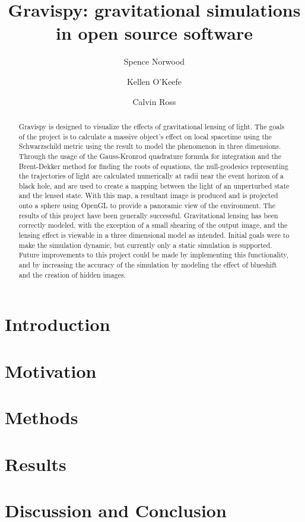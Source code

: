 \documentclass[
aps,prd,
preprint,
onecolumn,
12pt,
amsmath, amssymb,
secnumarabic,
]{revtex4-1}
\begin{document}
\title{Gravispy: gravitational simulations in open source software}
\author{Spence Norwood}
\author{Kellen O'Keefe}
\author{Calvin Ross}
\begin{abstract}
Gravispy is designed to visualize the effects of gravitational lensing of light.
The goals of the project is to calculate a massive object's effect on local spacetime using the Schwarzschild metric using the result to model the phenomenon in three dimensions.
Through the usage of the Gauss-Kronrod quadrature formula for integration and the Brent-Dekker method for finding the roots of equations, the null-geodesics representing the trajectories of light are calculated numerically at radii near the event horizon of a black hole, and are used to create a mapping between the light of an unperturbed state and the lensed state.
With this map, a resultant image is produced and is projected onto a sphere using OpenGL to provide a panoramic view of the environment.
The results of this project have been generally successful.
Gravitational lensing has been correctly modeled, with the exception of a small shearing of the output image, and the lensing effect is viewable in a three dimensional model as intended.
Initial goals were to make the simulation dynamic, but currently only a static simulation is supported.
Future improvements to this project could be made by implementing this functionality, and by increasing the accuracy of the simulation by modeling the effect of blueshift and the creation of hidden images.
\end{abstract}
\maketitle

\section{Introduction\label{sec:intro}}


\section{Motivation\label{sec:motive}}


\section{Methods\label{sec:method}}


\section{Results\label{sec:results}}


\section{Discussion and Conclusion}


\nocite{*}

\end{document}
